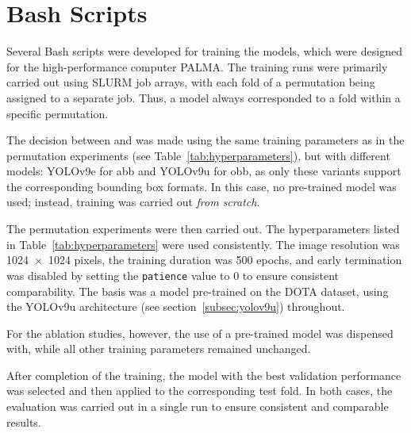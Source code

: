 \section{Bash Scripts}

Several Bash scripts were developed for training the models, which were designed for the high-performance computer \acrshort{PALMA}. The training runs were primarily carried out using \acrshort{SLURM} job arrays, with each fold of a permutation being assigned to a separate job. Thus, a model always corresponded to a fold within a specific permutation.  

The decision between  and  was made using the same training parameters as in the permutation experiments (see Table~\ref{tab:hyperparameters}), but with different models: \acrshort{YOLO}v9e for \acrshort{abb} and \acrshort{YOLO}v9u for \acrshort{obb}, as only these variants support the corresponding bounding box formats. In this case, no pre-trained model was used; instead, training was carried out \textit{from scratch}.
  
The permutation experiments were then carried out. The hyperparameters listed in Table~\ref{tab:hyperparameters} were used consistently. The image resolution was 1024~$\times$~1024 pixels, the training duration was 500 epochs, and early termination was disabled by setting the \texttt{patience} value to 0 to ensure consistent comparability. The basis was a model pre-trained on the \acrshort{DOTA} dataset, using the \acrshort{YOLO}v9u architecture (see section~\ref{subsec:yolov9u}) throughout.
  
For the ablation studies, however, the use of a pre-trained model was dispensed with, while all other training parameters remained unchanged.  

After completion of the training, the model with the best validation performance was selected and then applied to the corresponding test fold. In both cases, the evaluation was carried out in a single run to ensure consistent and comparable results.
    



